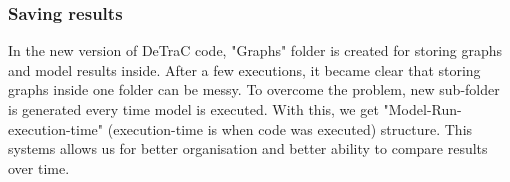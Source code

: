 \subsubsection{Saving results}
In the new version of DeTraC code, "Graphs" folder is created for storing graphs and model results inside. After a few executions, it became clear that storing graphs inside one folder can be messy. To overcome the problem, new sub-folder is generated every time model is executed. With this, we get "Model-Run-execution-time" (execution-time is when code was executed) structure. This systems allows us for better organisation and better ability to compare results over time.